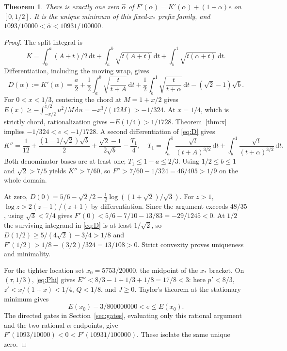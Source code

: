 \documentclass[11pt,letterpaper]{article}
\newtheorem{theorem}{Theorem}[section]
\newcommand{\dd}{\,\mathrm d}
\newcommand{\al}{\widehat\alpha}
\begin{document}
\begin{theorem}\label{thm:alpha}
There is exactly one zero $\al$ of
$F'(\alpha)=K'(\alpha)+(1+\alpha)e$ on $[0,1/2]$.
It is the unique minimum of this fixed-$x_*$ prefix family, and
$1093/10000<\al<10931/100000$.
\end{theorem}
\begin{proof}
The split integral is
\[
 K=\int_0^a(A+t)/2\dd t+\int_a^b\sqrt{t(A+t)}\dd t
                       +\int_b^1\sqrt{t(\alpha+t)}\dd t.
\]
Differentiation, including the moving wrap, gives
\begin{equation}\label{eq:D}
 D(\alpha):=K'(\alpha)
 =\frac a2+\frac12\int_a^b\sqrt{\frac t{t+A}}\dd t
 +\frac12\int_b^1\sqrt{\frac t{t+\alpha}}\dd t
 -(\sqrt2-1)\sqrt b.
\end{equation}
For $0<x<1/3$, centering the chord at $M=1+x/2$ gives
$E(x)\ge-\int_{-x/2}^{x/2}u^2/M\dd u=-x^3/(12M)>-1/324$.
At $x=1/4$, which is strictly chord, rationalization gives
$-E(1/4)>1/1728$. Theorem~\ref{thm:x} implies
$-1/324<e<-1/1728$.
A second differentiation of \eqref{eq:D} gives
\[
 K''=\frac1{12}+\frac{(1-1/\sqrt2)\sqrt b}{2}
       +\frac{\sqrt2-1}{2\sqrt b}-\frac{T_1}{4},
 \quad
 T_1=\int_a^b\frac{\sqrt t}{(t+A)^{3/2}}\dd t
       +\int_b^1\frac{\sqrt t}{(t+\alpha)^{3/2}}\dd t.
\]
Both denominator bases are at least one; $T_1\le1-a\le2/3$.
Using $1/2\le b\le1$ and $\sqrt2>7/5$ yields $K''>7/60$,
so $F''>7/60-1/324=46/405>1/9$ on the whole domain.

At zero,
$D(0)=5/6-\sqrt2/2-\tfrac12\log((1+\sqrt2)/\sqrt3)$.
For $z>1$, $\log z>2(z-1)/(z+1)$ by differentiation. Since the
argument exceeds $48/35$, using $\sqrt3<7/4$ gives
$F'(0)<5/6-7/10-13/83=-29/1245<0$.
At $1/2$ the surviving integrand in \eqref{eq:D} is at least
$1/\sqrt2$, so $D(1/2)\ge5/(4\sqrt2)-3/4>1/8$ and
$F'(1/2)>1/8-(3/2)/324=13/108>0$.
Strict convexity proves uniqueness and minimality.

For the tighter location set $x_0=5753/20000$, the midpoint of the
$x_*$ bracket. On $(\tau,1/3)$, \eqref{eq:Phi} gives
$E''<8/3-1+1/3+1/8=17/8<3$: here $p'<8/3$,
$z'<x/(1+x)<1/4$, $Q<1/8$, and $J\ge0$.
Taylor's theorem at the stationary minimum gives
\begin{equation}\label{eq:ebox}
 E(x_0)-3/800000000<e\le E(x_0).
\end{equation}
The directed gates in Section~\ref{sec:gates}, evaluating only this
rational argument and the two rational $\alpha$ endpoints, give
$F'(1093/10000)<0<F'(10931/100000)$. These isolate the same unique zero.
\end{proof}
\end{document}
